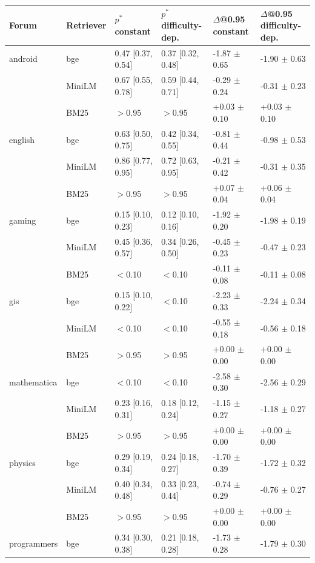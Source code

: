 \begin{tabular}{llllll}\toprule Forum & Retriever & $p^*$ constant & $p^*$ difficulty-dep. & $\Delta$@0.95 constant & $\Delta$@0.95 difficulty-dep.\\\midrule
android & bge & 0.47 [0.37, 0.54] & 0.37 [0.32, 0.48] & -1.87 $\pm$ 0.65 & -1.90 $\pm$ 0.63\\
 & MiniLM & 0.67 [0.55, 0.78] & 0.59 [0.44, 0.71] & -0.29 $\pm$ 0.24 & -0.31 $\pm$ 0.23\\
 & BM25 & $>$0.95 & $>$0.95 & +0.03 $\pm$ 0.10 & +0.03 $\pm$ 0.10\\
\addlinespace[1pt]
english & bge & 0.63 [0.50, 0.75] & 0.42 [0.34, 0.55] & -0.81 $\pm$ 0.44 & -0.98 $\pm$ 0.53\\
 & MiniLM & 0.86 [0.77, 0.95] & 0.72 [0.63, 0.95] & -0.21 $\pm$ 0.42 & -0.31 $\pm$ 0.35\\
 & BM25 & $>$0.95 & $>$0.95 & +0.07 $\pm$ 0.04 & +0.06 $\pm$ 0.04\\
\addlinespace[1pt]
gaming & bge & 0.15 [0.10, 0.23] & 0.12 [0.10, 0.16] & -1.92 $\pm$ 0.20 & -1.98 $\pm$ 0.19\\
 & MiniLM & 0.45 [0.36, 0.57] & 0.34 [0.26, 0.50] & -0.45 $\pm$ 0.23 & -0.47 $\pm$ 0.23\\
 & BM25 & $<$0.10 & $<$0.10 & -0.11 $\pm$ 0.08 & -0.11 $\pm$ 0.08\\
\addlinespace[1pt]
gis & bge & 0.15 [0.10, 0.22] & $<$0.10 & -2.23 $\pm$ 0.33 & -2.24 $\pm$ 0.34\\
 & MiniLM & $<$0.10 & $<$0.10 & -0.55 $\pm$ 0.18 & -0.56 $\pm$ 0.18\\
 & BM25 & $>$0.95 & $>$0.95 & +0.00 $\pm$ 0.00 & +0.00 $\pm$ 0.00\\
\addlinespace[1pt]
mathematica & bge & $<$0.10 & $<$0.10 & -2.58 $\pm$ 0.30 & -2.56 $\pm$ 0.29\\
 & MiniLM & 0.23 [0.16, 0.31] & 0.18 [0.12, 0.24] & -1.15 $\pm$ 0.27 & -1.18 $\pm$ 0.27\\
 & BM25 & $>$0.95 & $>$0.95 & +0.00 $\pm$ 0.00 & +0.00 $\pm$ 0.00\\
\addlinespace[1pt]
physics & bge & 0.29 [0.19, 0.34] & 0.24 [0.18, 0.27] & -1.70 $\pm$ 0.39 & -1.72 $\pm$ 0.32\\
 & MiniLM & 0.40 [0.34, 0.48] & 0.33 [0.23, 0.44] & -0.74 $\pm$ 0.29 & -0.76 $\pm$ 0.27\\
 & BM25 & $>$0.95 & $>$0.95 & +0.00 $\pm$ 0.00 & +0.00 $\pm$ 0.00\\
\addlinespace[1pt]
programmers & bge & 0.34 [0.30, 0.38] & 0.21 [0.18, 0.28] & -1.73 $\pm$ 0.28 & -1.79 $\pm$ 0.30\\

\end{tabular}
